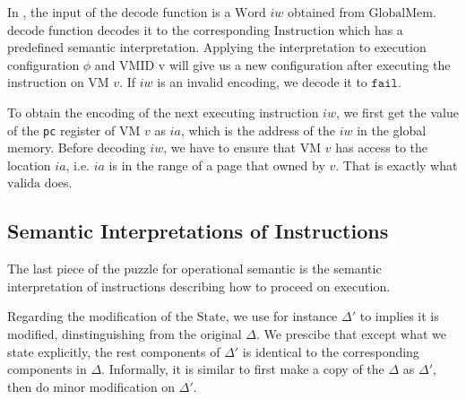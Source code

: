 \documentclass[a4paper]{article}
\newcommand*{\STATE}{\text{State}}
\newcommand*{\MEM}{\text{GlobalMem}}
\newcommand*{\WORD}{\text{Word}}
\newcommand*{\VMID}{\text{VMID}}
\newcommand*{\INSTR}{\text{Instruction}}
\newcommand*{\decode}{\text{decode}}
\newcommand*{\valida}{\text{valida}}
\newcommand{\refr}[1]{\hyperlink{#1}{\TirName {#1}}}
\begin{document}
In \refr{ExecInstr}, the input of the $\decode$ function is a $\WORD$ $iw$ obtained from $\MEM$.
$\decode$ function decodes it to the corresponding $\INSTR$ which has a
predefined semantic interpretation. Applying the interpretation to execution
configuration $\phi$ and $\VMID$ v will give us a new configuration after
executing the instruction on VM $v$. If $iw$ is an invalid encoding, we decode
it to $\mathtt{fail}$.

To obtain the encoding of the next executing instruction $iw$, we first get the
value of the \texttt{pc} register of VM $v$ as $ia$, which is the address of the
$iw$ in the global memory. Before decoding $iw$, we have to ensure that VM $v$
has access to the location $ia$, i.e. $ia$ is in the range of a page that owned
by $v$. That is exactly what $\valida$ does. 


\subsection{Semantic Interpretations of Instructions}

The last piece of the puzzle for operational semantic is the semantic interpretation
of instructions describing how to proceed on execution.

Regarding the modification of the $\STATE$, we use for instance $\Delta'$ to
implies it is modified, dinstinguishing from the original $\Delta$.
We prescibe that except what we state explicitly, the rest components of $\Delta'$ is identical to the corresponding components in $\Delta$. Informally, it is similar to first make a copy of the $\Delta$ as $\Delta'$, then do minor modification on $\Delta'$.
\end{document}
